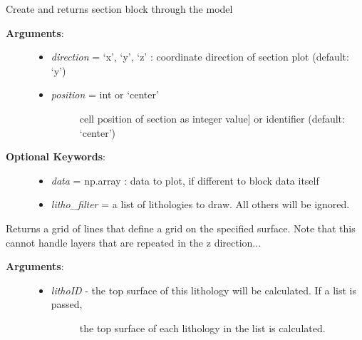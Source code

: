 \documentclass[a4paper,10pt,english]{sphinxmanual}
\begin{document}
\begin{fulllineitems}

\begin{fulllineitems}
\label{pynoddy:pynoddy.output.NoddyOutput.get_section_voxels}
Create and returns section block through the model
\begin{description}
\item[{\textbf{Arguments}:}] \leavevmode\begin{itemize}
\item {} 
\emph{direction} = `x', `y', `z' : coordinate direction of section plot (default: `y')

\item {} \begin{description}
\item[{\emph{position} = int or `center'}] \leavevmode{[}cell position of section as integer value{]}
or identifier (default: `center')

\end{description}

\end{itemize}

\item[{\textbf{Optional Keywords}:}] \leavevmode\begin{itemize}
\item {} 
\emph{data} = np.array : data to plot, if different to block data itself

\item {} 
\emph{litho\_filter} = a list of lithologies to draw. All others will be ignored.

\end{itemize}

\end{description}

\end{fulllineitems}


\begin{fulllineitems}
\label{pynoddy:pynoddy.output.NoddyOutput.get_surface_grid}
Returns a grid of lines that define a grid on the specified surface. Note that this cannot
handle layers that are repeated in the z direction...
\begin{description}
\item[{\textbf{Arguments}:}] \leavevmode\begin{itemize}
\item {} \begin{description}
\item[{\emph{lithoID} - the top surface of this lithology will be calculated. If a list is passed,}] \leavevmode
the top surface of each lithology in the list is calculated.


\end{description}
\end{itemize}
\end{description}
\end{fulllineitems}
\end{fulllineitems}
\end{document}

